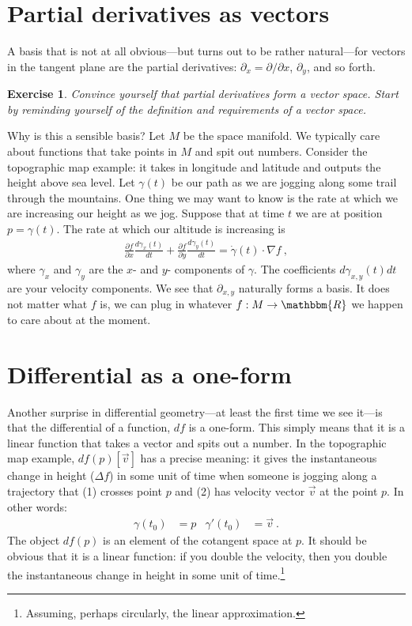 \documentclass[
  11pt,
	colorful,
	raggedright,
]{tufte-style-thesis-flip}
\newtheorem{exercise}{Exercise}[section]
\begin{document}
\section{Partial derivatives as vectors}

A basis that is not at all obvious---but turns out to be rather natural---for vectors in the tangent plane are the partial derivatives: $\partial_x = \partial/\partial x$, $\partial_y$, and so forth. 
\begin{exercise}
Convince yourself that partial derivatives form a vector space. Start by reminding yourself of the definition and requirements of a vector space.
\end{exercise}
Why is this a sensible basis? Let $M$ be the space manifold. We typically care about functions that take points in $M$ and spit out numbers. Consider the topographic map example: it takes in longitude and latitude and outputs the height above sea level. 
Let $\gamma(t)$ be our path as we are jogging along some trail through the mountains. One thing we may want to know is the rate at which we are increasing our height as we jog. Suppose that at time $t$ we are at position $p = \gamma(t)$. The rate at which our altitude is increasing is 
\begin{align}
  \frac{\partial f}{\partial x}
  \frac{d\gamma_x(t)}{dt}
  +
  \frac{\partial f}{\partial y}
  \frac{d\gamma_y(t)}{dt} 
  =
  \dot\gamma(t)\cdot \nabla f
  \ ,
\end{align}
where $\gamma_x$ and $\gamma_y$ are the $x$- and $y$- components of $\gamma$. The coefficients ${d\gamma_{x,y}(t)}{dt}$ are your velocity components. We see that $\partial_{x,y}$ naturally forms a basis. It does not matter what $f$ is, we can plug in whatever $f: M\to \mathbbm{R}$ we happen to care about at the moment.


\section{Differential as a one-form}
\label{sec:d:as:one:form}

Another surprise in differential geometry---at least the first time we see it---is that the differential of a function, $df$ is a one-form. This simply means that it is a linear function that takes a vector and spits out a number. In the topographic map example, $df(p)[\vec{v}]$ has a precise meaning: it gives the instantaneous change in height ($\Delta f$) in some unit of time when someone is jogging along a trajectory that (1) crosses point $p$ and (2) has velocity vector $\vec{v}$ at the point $p$. In other words:
\begin{align}
  \gamma(t_0) &= p & \gamma'(t_0) &= \vec{v} \ .
\end{align}
The object $df(p)$ is an element of the cotangent space at $p$. It should be obvious that it is a linear function: if you double the velocity, then you double the instantaneous change in height in some unit of time.\footnote{Assuming, perhaps circularly, the linear approximation.}
\end{document}
